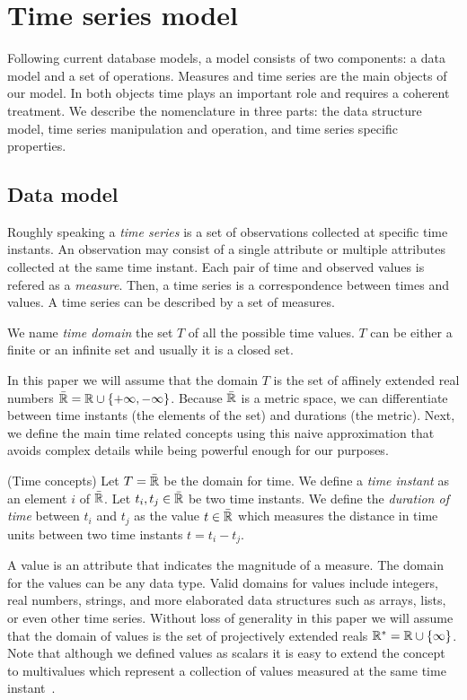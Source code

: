 
\section{Time series model}
\label{sec:model:TSMS}

Following current database models, a  model consists of two
components: a data model and a set of operations. Measures and time
series are the main objects of our  model. In both objects
time plays an important role and requires a coherent treatment.
%
We describe the  nomenclature in three
parts: the data structure model, time series manipulation and
operation, and time series specific properties.


\subsection{Data model}

Roughly speaking a \emph{time series} is a set of observations
collected at specific time instants. An observation may consist of a
single attribute or multiple attributes collected at the same time
instant.  Each pair of time and observed values is refered as a
\emph{measure}. Then, a time series is a correspondence between times
and values. A time series can be described by a set of measures.

We name \emph{time domain} the set $T$ of all the possible time
values. $T$ can be either a finite or an infinite set and usually it
is a closed set. 

In this paper we will assume that the domain $T$ is the set of
affinely extended real numbers $\bar{\mathbb{R}} = \mathbb{R} \cup
\{+\infty,-\infty\}$. Because $\bar{\mathbb{R}}$ is a metric space, we can
differentiate between time instants (the elements of the set) and
durations (the metric). Next, we define the main time related concepts
using this naive approximation that avoids complex details while being
powerful enough for our purposes.

\begin{definition}(Time concepts)
  \label{def:model:temps}
  Let $T=\bar{\mathbb{R}}$ be the domain for time.
  We define a \emph{time instant} as an element $i$ of $\bar{\mathbb{R}}$.
  Let $t_i,t_j\in\bar{\mathbb{R}}$ be two time instants.  We define the
  \emph{duration of time} between $t_i$ and $t_j$ as the value $t \in
  \bar{\mathbb{R}}$ which measures the distance in time units between two time
  instants $t = t_i - t_j$.
\end{definition}

A value is an attribute that indicates the magnitude of a measure. The
domain for the values can be any data type. Valid domains for values
include integers, real numbers, strings, and more elaborated data
structures such as arrays, lists, or even other time series. Without
loss of generality in this paper we will assume that the domain of
values is the set of projectively extended reals $\mathbb{R}^{*} = \mathbb{R} \cup
\{\infty\}$.
%
%
Note that although we defined values as scalars it is easy to extend
the concept to multivalues which represent a collection of values
measured at the same time instant~\cite{assfalg08:thesis}.


